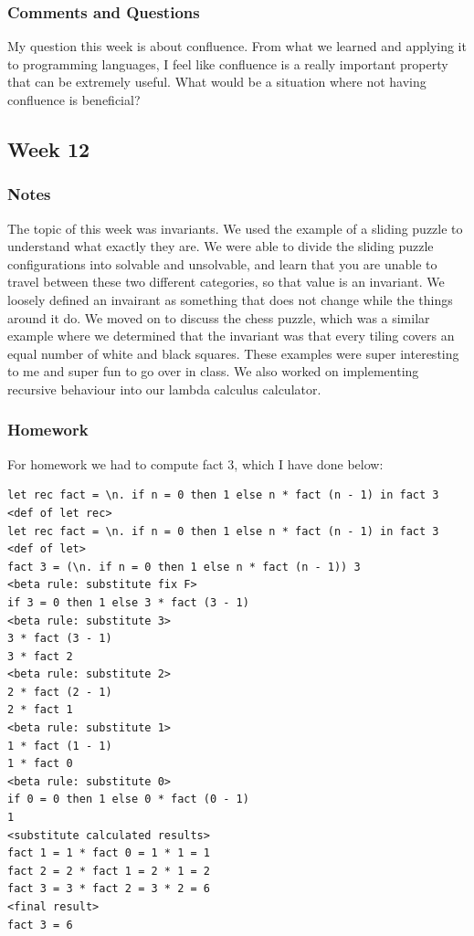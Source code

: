 \documentclass{article}
\theoremstyle{theorem}
\theoremstyle{definition}
\theoremstyle{remark}
\begin{document}
\subsubsection*{Comments and Questions}
My question this week is about confluence. From what we learned and applying it to programming languages,
I feel like confluence is a really important property that can be extremely useful. What would be a situation
where not having confluence is beneficial?
\subsection{Week 12}
\subsubsection*{Notes}
The topic of this week was invariants. We used the example of a sliding puzzle to understand what exactly
they are. We were able to divide the sliding puzzle configurations into solvable and unsolvable, and 
learn that you are unable to travel between these two different categories, so that value is an invariant.
We loosely defined an invairant as something that does not change while the things around it do. We moved
on to discuss the chess puzzle, which was a similar example where we determined that the invariant was that
every tiling covers an equal number of white and black squares. These examples were super interesting to me
and super fun to go over in class. We also worked on implementing recursive behaviour into our lambda 
calculus calculator.
\subsubsection*{Homework}
For homework we had to compute fact 3, which I have done below:

\begin{verbatim}
let rec fact = \n. if n = 0 then 1 else n * fact (n - 1) in fact 3
<def of let rec>
let rec fact = \n. if n = 0 then 1 else n * fact (n - 1) in fact 3
<def of let>
fact 3 = (\n. if n = 0 then 1 else n * fact (n - 1)) 3
<beta rule: substitute fix F>
if 3 = 0 then 1 else 3 * fact (3 - 1)
<beta rule: substitute 3>
3 * fact (3 - 1)
3 * fact 2
<beta rule: substitute 2>
2 * fact (2 - 1)
2 * fact 1
<beta rule: substitute 1>
1 * fact (1 - 1)
1 * fact 0
<beta rule: substitute 0>
if 0 = 0 then 1 else 0 * fact (0 - 1)
1
<substitute calculated results>
fact 1 = 1 * fact 0 = 1 * 1 = 1
fact 2 = 2 * fact 1 = 2 * 1 = 2
fact 3 = 3 * fact 2 = 3 * 2 = 6
<final result>
fact 3 = 6

\end{verbatim}
\end{document}
